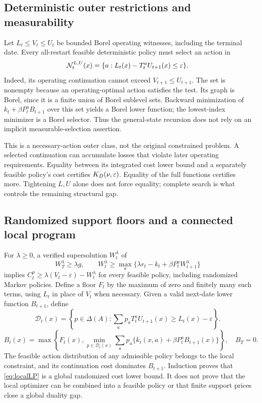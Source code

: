 \subsection{Deterministic outer restrictions and measurability}
Let $L_t\leq V_t\leq U_t$ be bounded Borel operating witnesses, including the terminal date. Every all-restart feasible deterministic policy must select an action in
\begin{equation}\label{eq:necessary}
 \mathcal N_t^{L,U}(x)=\{a:L_t(x)-T_t^aU_{t+1}(x)\leq\varepsilon\}.
\end{equation}
Indeed, its operating continuation cannot exceed $V_{t+1}\leq U_{t+1}$. The set is nonempty because an operating-optimal action satisfies the test. Its graph is Borel, since it is a finite union of Borel sublevel sets. Backward minimization of $k_t+\beta P_t^aB_{t+1}$ over this set yields a Borel lower function; the lowest-index minimizer is a Borel selector. Thus the general-state recursion does not rely on an implicit measurable-selection assertion.

This is a necessary-action outer class, not the original constrained problem. A selected continuation can accumulate losses that violate later operating requirements. Equality between its integrated cost lower bound and a separately feasible policy's cost certifies $K_D(\nu,\varepsilon)$. Equality of the full functions certifies more. Tightening $L,U$ alone does not force equality; complete search is what controls the remaining structural gap.

\subsection{Randomized support floors and a connected local program}\label{sec:local}
For $\lambda\geq0$, a verified supersolution $W_t^\lambda$ of
\[
 W_T^\lambda\geq\lambda g,\qquad
 W_t^\lambda\geq\max_a\{\lambda r_t-k_t+\beta P_t^aW_{t+1}^\lambda\}
\]
implies $C_t^p\geq\lambda(V_t-\varepsilon)-W_t^\lambda$ for every feasible policy, including randomized Markov policies. Define a floor $F_t$ by the maximum of zero and finitely many such terms, using $L_t$ in place of $V_t$ when necessary. Given a valid next-date lower function $B_{t+1}$, define
\[
 \mathcal D_t(x)=\left\{p\in\Delta(A):\sum_ap_aT_t^aU_{t+1}(x)\geq L_t(x)-\varepsilon\right\}.
\]
\begin{equation}\label{eq:localLP}
 B_t(x)=\max\left\{F_t(x),\min_{p\in\mathcal D_t(x)}
 \sum_ap_a\{k_t(x,a)+\beta P_t^aB_{t+1}(x)\}\right\},\quad B_T=0.
\end{equation}
The feasible action distribution of any admissible policy belongs to the local constraint, and its continuation cost dominates $B_{t+1}$. Induction proves that \eqref{eq:localLP} is a global randomized cost lower bound. It does not prove that the local optimizer can be combined into a feasible policy or that finite support prices close a global duality gap.

